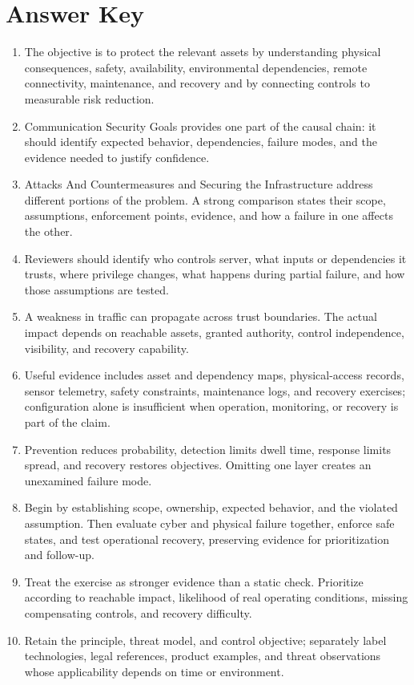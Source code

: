 \documentclass[11pt,letterpaper]{article}
\begin{document}
\section*{Answer Key}
\begin{enumerate}
\item The objective is to protect the relevant assets by understanding physical consequences, safety, availability, environmental dependencies, remote connectivity, maintenance, and recovery and by connecting controls to measurable risk reduction.
\item Communication Security Goals provides one part of the causal chain: it should identify expected behavior, dependencies, failure modes, and the evidence needed to justify confidence.
\item Attacks And Countermeasures and Securing the Infrastructure address different portions of the problem. A strong comparison states their scope, assumptions, enforcement points, evidence, and how a failure in one affects the other.
\item Reviewers should identify who controls server, what inputs or dependencies it trusts, where privilege changes, what happens during partial failure, and how those assumptions are tested.
\item A weakness in traffic can propagate across trust boundaries. The actual impact depends on reachable assets, granted authority, control independence, visibility, and recovery capability.
\item Useful evidence includes asset and dependency maps, physical-access records, sensor telemetry, safety constraints, maintenance logs, and recovery exercises; configuration alone is insufficient when operation, monitoring, or recovery is part of the claim.
\item Prevention reduces probability, detection limits dwell time, response limits spread, and recovery restores objectives. Omitting one layer creates an unexamined failure mode.
\item Begin by establishing scope, ownership, expected behavior, and the violated assumption. Then evaluate cyber and physical failure together, enforce safe states, and test operational recovery, preserving evidence for prioritization and follow-up.
\item Treat the exercise as stronger evidence than a static check. Prioritize according to reachable impact, likelihood of real operating conditions, missing compensating controls, and recovery difficulty.
\item Retain the principle, threat model, and control objective; separately label technologies, legal references, product examples, and threat observations whose applicability depends on time or environment.
\end{enumerate}
\end{document}
